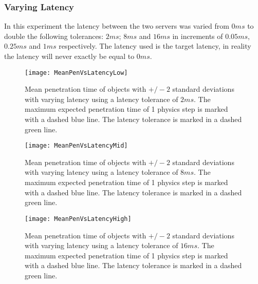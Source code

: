 \subsubsection{Varying Latency}

In this experiment the latency between the two servers was varied from $0ms$ to double the following tolerances: $2ms$; $8ms$ and $16ms$ in increments of $0.05ms$, $0.25ms$ and $1ms$ respectively. The latency used is the target latency, in reality the latency will never exactly be equal to $0ms$.

\begin{figure}[t]
	\centering
	\texttt{[image: MeanPenVsLatencyLow]}
	\caption{Mean penetration time of objects with $+/-2$ standard deviations with varying latency using a latency tolerance of $2ms$. The maximum expected penetration time of 1 physics step is marked with a dashed blue line. The latency tolerance is marked in a dashed green line.}
	\label{fig_CollisionsPenVsLatencyLow}
\end{figure}
\begin{figure}[t]
	\centering
	\texttt{[image: MeanPenVsLatencyMid]}
	\caption{Mean penetration time of objects with $+/-2$ standard deviations with varying latency using a latency tolerance of $8ms$. The maximum expected penetration time of 1 physics step is marked with a dashed blue line. The latency tolerance is marked in a dashed green line.}
	\label{fig_CollisionsPenVsLatencyMid}
\end{figure}
\begin{figure}[t]
	\centering
	\texttt{[image: MeanPenVsLatencyHigh]}
	\caption{Mean penetration time of objects with $+/-2$ standard deviations with varying latency using a latency tolerance of $16ms$. The maximum expected penetration time of 1 physics step is marked with a dashed blue line. The latency tolerance is marked in a dashed green line.}
	\label{fig_CollisionsPenVsLatencyHigh}
\end{figure}

%
%

